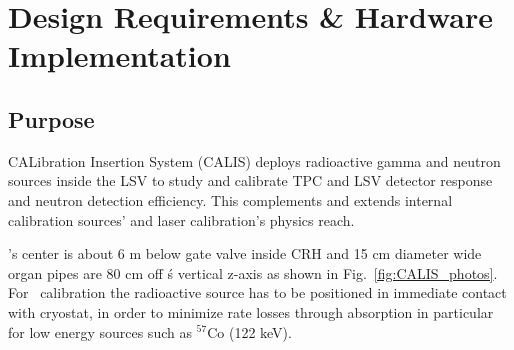 \section{Design Requirements \& Hardware Implementation} \label{sec:hardware}\label{sec:design_requirements}

\subsection{Purpose}
CALibration Insertion System (CALIS) deploys radioactive gamma and neutron sources inside the LSV to study and calibrate TPC and LSV detector response and neutron detection efficiency. This complements and extends internal calibration sources' and laser calibration's physics reach. 

\lsv's center is about 6 m below gate valve inside CRH
 and 15 cm diameter wide organ pipes are 80 cm off \tpc\'s vertical z-axis as shown in Fig.~\ref{fig:CALIS_photos}. For \tpc\ calibration the radioactive source has to be positioned in immediate contact with cryostat, in order to minimize rate losses through absorption in particular for low energy sources such as $^{57}$Co (122 keV). 

